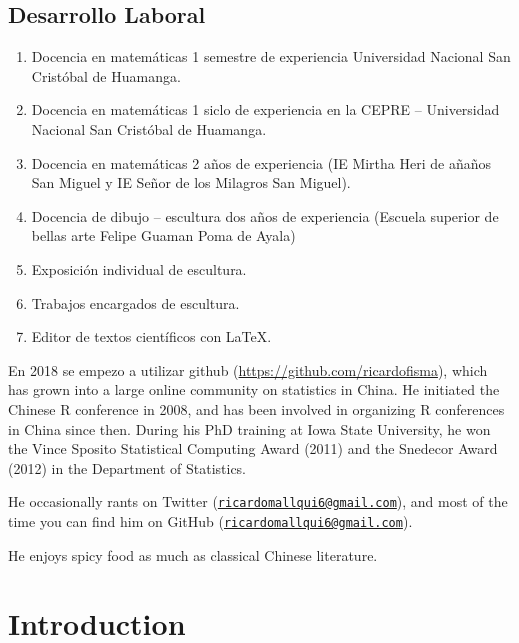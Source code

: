 \documentclass[]{krantz}
\begin{document}
\hypertarget{desarrollo-laboral}{%
\section*{Desarrollo Laboral}\label{desarrollo-laboral}}

\begin{enumerate}
\def\labelenumi{\arabic{enumi}.}
\item
  Docencia en matemáticas 1 semestre de experiencia Universidad Nacional San Cristóbal de Huamanga.
\item
  Docencia en matemáticas 1 siclo de experiencia en la CEPRE -- Universidad Nacional San Cristóbal de Huamanga.
\item
  Docencia en matemáticas 2 años de experiencia (IE Mirtha Heri de añaños San Miguel y IE Señor de los Milagros San Miguel).
\item
  Docencia de dibujo -- escultura dos años de experiencia (Escuela superior de bellas arte Felipe Guaman Poma de Ayala)
\item
  Exposición individual de escultura.
\item
  Trabajos encargados de escultura.
\item
  Editor de textos científicos con LaTeX.
\end{enumerate}

En 2018 se empezo a utilizar github (\url{https://github.com/ricardofisma}), which has grown into a large online community on statistics in China. He initiated the Chinese R conference in 2008, and has been involved in organizing R conferences in China since then. During his PhD training at Iowa State University, he won the Vince Sposito Statistical Computing Award (2011) and the Snedecor Award (2012) in the Department of Statistics.

He occasionally rants on Twitter (\href{mailto:ricardomallqui6@gmail.com}{\nolinkurl{ricardomallqui6@gmail.com}}), and most of the time you can find him on GitHub (\href{mailto:ricardomallqui6@gmail.com}{\nolinkurl{ricardomallqui6@gmail.com}}).

He enjoys spicy food as much as classical Chinese literature.

\hypertarget{introduction}{%
\chapter*{Introduction}\label{introduction}}
\end{document}
